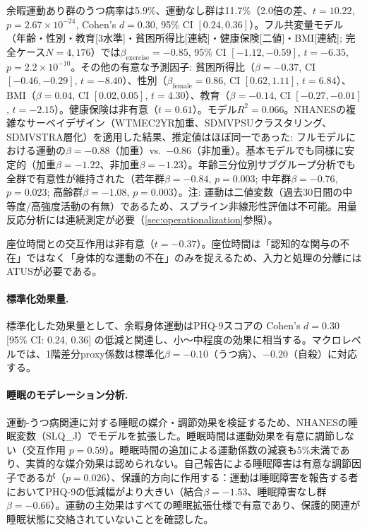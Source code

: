 \documentclass[a4paper,11pt,titlepage]{article}
\begin{document}
余暇運動あり群のうつ病率は5.9\%、運動なし群は11.7\%（2.0倍の差、$t = 10.22$, $p = 2.67 \times 10^{-24}$, Cohen's $d = 0.30$, 95\% CI $[0.24, 0.36]$）。フル共変量モデル（年齢・性別・教育[3水準]・貧困所得比[連続]・健康保険[二値]・BMI[連続]; 完全ケース$N = 4{,}176$）では$\beta_{\text{exercise}} = -0.85$, 95\% CI $[-1.12, -0.59]$, $t = -6.35$, $p = 2.2 \times 10^{-10}$。その他の有意な予測因子: 貧困所得比（$\beta = -0.37$, CI $[-0.46, -0.29]$, $t = -8.40$）、性別（$\beta_{\text{female}} = 0.86$, CI $[0.62, 1.11]$, $t = 6.84$）、BMI（$\beta = 0.04$, CI $[0.02, 0.05]$, $t = 4.30$）、教育（$\beta = -0.14$, CI $[-0.27, -0.01]$, $t = -2.15$）。健康保険は非有意（$t = 0.61$）。モデル$R^2 = 0.066$。NHANESの複雑なサーベイデザイン（WTMEC2YR加重、SDMVPSUクラスタリング、SDMVSTRA層化）を適用した結果、推定値はほぼ同一であった: フルモデルにおける運動の$\beta = -0.88$（加重）vs.\ $-0.86$（非加重）。基本モデルでも同様に安定的（加重$\beta = -1.22$、非加重$\beta = -1.23$）。年齢三分位別サブグループ分析でも全群で有意性が維持された（若年群$\beta = -0.84$, $p = 0.003$; 中年群$\beta = -0.76$, $p = 0.023$; 高齢群$\beta = -1.08$, $p = 0.003$）。注: 運動は二値変数（過去30日間の中等度/高強度活動の有無）であるため、スプライン非線形性評価は不可能。用量反応分析には連続測定が必要（\cref{sec:operationalization}参照）。

座位時間との交互作用は非有意（$t = -0.37$）。座位時間は「認知的な関与の不在」ではなく「身体的な運動の不在」のみを捉えるため、入力と処理の分離にはATUSが必要である。

\paragraph{標準化効果量.}
標準化した効果量として、余暇身体運動はPHQ-9スコアの Cohen's $d = 0.30$ [95\% CI: 0.24, 0.36] の低減と関連し、小〜中程度の効果に相当する。マクロレベルでは、1階差分proxy係数は標準化$\beta = -0.10$（うつ病）、$-0.20$（自殺）に対応する。

\paragraph{睡眠のモデレーション分析.}
運動-うつ病関連に対する睡眠の媒介・調節効果を検証するため、NHANESの睡眠変数（SLQ\_J）でモデルを拡張した。睡眠時間は運動効果を有意に調節しない（交互作用 $p = 0.59$）。睡眠時間の追加による運動係数の減衰も5\%未満であり、実質的な媒介効果は認められない。自己報告による睡眠障害は有意な調節因子であるが（$p = 0.026$）、保護的方向に作用する：運動は睡眠障害を報告する者においてPHQ-9の低減幅がより大きい（結合$\beta = -1.53$、睡眠障害なし群$\beta = -0.66$）。運動の主効果はすべての睡眠拡張仕様で有意であり、保護的関連が睡眠状態に交絡されていないことを確認した。
\end{document}

